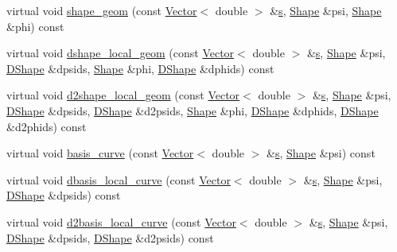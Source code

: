 \begin{DoxyCompactItemize}
\item 
virtual void \hyperlink{classoomph_1_1C1CurvedElementBase_ae8b0385cfb2eeeb2e17916d76d1e439e}{shape\+\_\+geom} (const \hyperlink{classoomph_1_1Vector}{Vector}$<$ double $>$ \&\hyperlink{cfortran_8h_ab7123126e4885ef647dd9c6e3807a21c}{s}, \hyperlink{classoomph_1_1Shape}{Shape} \&psi, \hyperlink{classoomph_1_1Shape}{Shape} \&phi) const
\item 
virtual void \hyperlink{classoomph_1_1C1CurvedElementBase_a73eff2b9d4873234465778f53bbeaec8}{dshape\+\_\+local\+\_\+geom} (const \hyperlink{classoomph_1_1Vector}{Vector}$<$ double $>$ \&\hyperlink{cfortran_8h_ab7123126e4885ef647dd9c6e3807a21c}{s}, \hyperlink{classoomph_1_1Shape}{Shape} \&psi, \hyperlink{classoomph_1_1DShape}{D\+Shape} \&dpsids, \hyperlink{classoomph_1_1Shape}{Shape} \&phi, \hyperlink{classoomph_1_1DShape}{D\+Shape} \&dphids) const
\item 
virtual void \hyperlink{classoomph_1_1C1CurvedElementBase_abafd0a405e40d018020dbffe49cf7258}{d2shape\+\_\+local\+\_\+geom} (const \hyperlink{classoomph_1_1Vector}{Vector}$<$ double $>$ \&\hyperlink{cfortran_8h_ab7123126e4885ef647dd9c6e3807a21c}{s}, \hyperlink{classoomph_1_1Shape}{Shape} \&psi, \hyperlink{classoomph_1_1DShape}{D\+Shape} \&dpsids, \hyperlink{classoomph_1_1DShape}{D\+Shape} \&d2psids, \hyperlink{classoomph_1_1Shape}{Shape} \&phi, \hyperlink{classoomph_1_1DShape}{D\+Shape} \&dphids, \hyperlink{classoomph_1_1DShape}{D\+Shape} \&d2phids) const
\item 
virtual void \hyperlink{classoomph_1_1C1CurvedElementBase_a9aca3e797997aeb999987b6f69c31320}{basis\+\_\+curve} (const \hyperlink{classoomph_1_1Vector}{Vector}$<$ double $>$ \&\hyperlink{cfortran_8h_ab7123126e4885ef647dd9c6e3807a21c}{s}, \hyperlink{classoomph_1_1Shape}{Shape} \&psi) const
\item 
virtual void \hyperlink{classoomph_1_1C1CurvedElementBase_a819553bb577933323c1e9c7943d04cad}{dbasis\+\_\+local\+\_\+curve} (const \hyperlink{classoomph_1_1Vector}{Vector}$<$ double $>$ \&\hyperlink{cfortran_8h_ab7123126e4885ef647dd9c6e3807a21c}{s}, \hyperlink{classoomph_1_1Shape}{Shape} \&psi, \hyperlink{classoomph_1_1DShape}{D\+Shape} \&dpsids) const
\item 
virtual void \hyperlink{classoomph_1_1C1CurvedElementBase_a7bcb3462fd699a3b3f6a8336ec8ed62e}{d2basis\+\_\+local\+\_\+curve} (const \hyperlink{classoomph_1_1Vector}{Vector}$<$ double $>$ \&\hyperlink{cfortran_8h_ab7123126e4885ef647dd9c6e3807a21c}{s}, \hyperlink{classoomph_1_1Shape}{Shape} \&psi, \hyperlink{classoomph_1_1DShape}{D\+Shape} \&dpsids, \hyperlink{classoomph_1_1DShape}{D\+Shape} \&d2psids) const

\end{DoxyCompactItemize}
